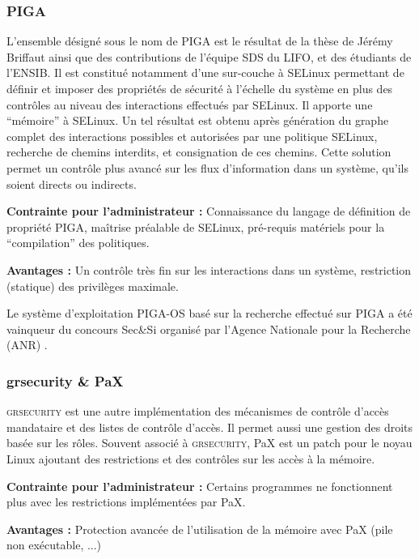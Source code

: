 \subsubsection{PIGA}

L'ensemble désigné sous le nom de PIGA est le résultat de la thèse de Jérémy Briffaut ainsi que des contributions de l'équipe SDS du LIFO, et des étudiants de l'ENSIB. Il est constitué notamment d'une sur-couche à SELinux permettant de définir et imposer des propriétés de sécurité à l'échelle du système en plus des contrôles au niveau des interactions effectués par SELinux. Il apporte une ``mémoire'' à SELinux. Un tel résultat est obtenu après génération du graphe complet des interactions possibles et autorisées par une politique SELinux, recherche de chemins interdits, et consignation de ces chemins. Cette solution permet un contrôle plus avancé sur les flux d'information dans un système, qu'ils soient directs ou indirects.

\begin{list}{}{}
 \item \textbf{Contrainte pour l'administrateur :} Connaissance du langage de définition de propriété PIGA, maîtrise préalable de SELinux, pré-requis matériels pour la ``compilation'' des politiques.
 \item \textbf{Avantages :} Un contrôle très fin sur les interactions dans un système, restriction (statique) des privilèges maximale.
\end{list}

Le système d'exploitation PIGA-OS basé sur la recherche effectué sur PIGA a été vainqueur du concours Sec\&Si organisé par l'Agence Nationale pour la Recherche (ANR) \cite{PIGA}\cite{PIGA2}.

\subsubsection{grsecurity \& PaX}

\textsc{grsecurity} est une autre implémentation des mécanismes de contrôle d'accès mandataire et des listes de contrôle d'accès. Il permet aussi une gestion des droits basée sur les rôles. Souvent associé à \textsc{grsecurity}, PaX est un patch pour le noyau Linux ajoutant des restrictions et des contrôles sur les accès à la mémoire.

\begin{list}{}{}
 \item \textbf{Contrainte pour l'administrateur :} Certains programmes ne fonctionnent plus avec les restrictions implémentées par PaX.
 \item \textbf{Avantages :} Protection avancée de l'utilisation de la mémoire avec PaX (pile non exécutable, ...)
\end{list}

